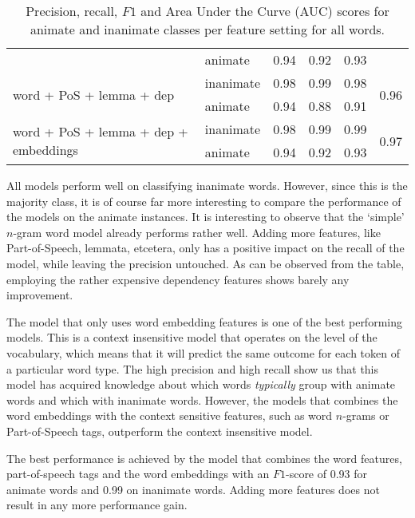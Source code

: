\documentclass[a4paper,UKenglish]{oasics}
\begin{document}
\begin{table}
\begin{tabular}{llrrrr}
                                                       & animate     &       0.94 &    0.92 &    0.93 &  \\
\multirow{2}{*}{word + PoS + lemma + dep}              & inanimate     &       0.98 &    0.99 &    0.98 & \multirow{2}{*}{0.96} \\
                                                       & animate     &       0.94 &    0.88 &    0.91 &  \\
\multirow{2}{*}{word + PoS + lemma + dep + embeddings} & inanimate     &       0.98 &    0.99 &    0.99 & \multirow{2}{*}{0.97} \\
                                                       & animate     &       0.94 &    0.92 &    0.93 &  \\
\bottomrule
\end{tabular}
\caption{Precision, recall, $F1$ and Area Under the Curve (AUC) scores for animate and inanimate classes per feature setting for all words.}
\label{tab:results-all}
\end{table}


All models perform well on classifying inanimate words. However, since
this is the majority class, it is of course far more interesting to
compare the performance of the models on the animate instances. It is
interesting to observe that the `simple' $n$-gram word model already
performs rather well. Adding more features, like Part-of-Speech,
lemmata, etcetera, only has a positive impact on the recall of the
model, while leaving the precision untouched. As can be observed from
the table, employing the rather expensive dependency features shows
barely any improvement.

The model that only uses word embedding features is one of the best
performing models. This is a context insensitive model that operates
on the level of the vocabulary, which means that it will predict the
same outcome for each token of a particular word type. The high
precision and high recall show us that this model has acquired
knowledge about which words \textit{typically} group with animate
words and which with inanimate words. However, the models that combines
the word embeddings with the context sensitive features, such as word
$n$-grams or Part-of-Speech tags, outperform the context insensitive
model.

The best performance is
achieved by the model that combines the word features, part-of-speech
tags and the word embeddings with an $F1$-score of 0.93 for animate
words and 0.99 on inanimate words. Adding more features does not
result in any more performance gain.
\end{document}
